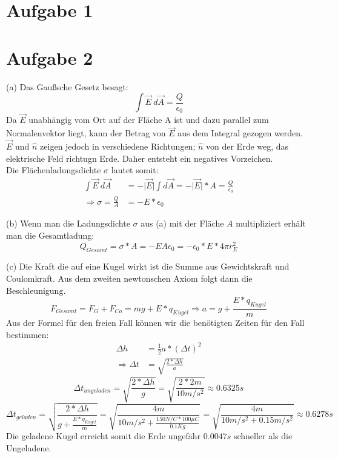 \documentclass[a4paper]{article}
\newcommand{\epszero}{\epsilon_0}
\begin{document}
\thispagestyle{fancy}

\section*{Aufgabe 1}
\section*{Aufgabe 2}
\par{(a)} 
Das Gaußsche Gesetz besagt:
\[ \int \vec{E} \  d\vec{A} = \frac{Q}{\epsilon_0} \]
Da $\vec{E}$ unabhängig vom Ort auf der Fläche A ist und dazu parallel zum Normalenvektor liegt, kann der Betrag von $\vec{E}$ aus dem Integral gezogen werden.\\
$\vec{E}$ und $\hat{n}$ zeigen jedoch in verschiedene Richtungen; $\hat{n}$ von der Erde weg, das elektrische Feld richtugn Erde. Daher entsteht ein negatives Vorzeichen.\\
Die Flächenladungsdichte $\sigma$ lautet somit:
\begin{align*}
	\int \vec E \ d\vec A &= -\vert \vec E \vert \int d\vec A = -\vert \vec E \vert * A = \frac{Q}{\epszero} \\
	\Rightarrow \sigma = \frac{Q}{A} &= -E*\epszero
\end{align*}

\par{(b)}
Wenn man die Ladungsdichte $\sigma$ aus (a) mit der Fläche $A$ multipliziert erhält man die Gesamtladung:
\[
	Q_{Gesamt} = \sigma * A = -EA\epszero = -\epszero * E * 4\pi r_E^2
\]

\par{(c)}
Die Kraft die auf eine Kugel wirkt ist die Summe aus Gewichtskraft und Coulomkraft. Aus dem zweiten newtonschen Axiom folgt dann die Beschleunigung.
\[
	F_{Gesamt} = F_G + F_{Co} = mg + E*q_{Kugel} \Rightarrow a = g + \frac{E*q_{Kugel}}{m} 
\]
Aus der Formel für den freien Fall können wir die benötigten Zeiten für den Fall bestimmen:
\begin{align*}
	\Delta h &= \frac{1}{2} a*(\Delta t)^2 \\
	\Rightarrow \Delta t &= \sqrt{\frac{2*\Delta h}{a}}
\end{align*}
\[ 
	\Delta t_{ungeladen} = \sqrt{\frac{2*\Delta h}{g}} = \sqrt{\frac{2*2m}{10m/s^2}} \approx 0.6325s
\]
\[
	\Delta t_{geladen} = \sqrt{\frac{2*\Delta h}{g + \frac{E*q_{Kugel}}{m} }}
	= \sqrt{\frac{4m}{10m/s^2 + \frac{150N/C * 100 \mu C}{0.1 Kg} }}
	= \sqrt{\frac{4m}{10m/s^2 + 0.15 m/s^2}} \approx 0.6278s
\]
Die geladene Kugel erreicht somit die Erde ungefähr $0.0047s$ schneller als die Ungeladene.
\end{document}
